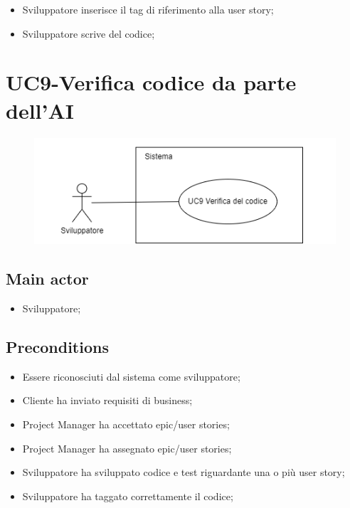 \documentclass{article}
\begin{document}
        \begin{itemize}
            \item Sviluppatore inserisce il tag di riferimento alla user story;
            \item Sviluppatore scrive del codice;
        \end{itemize}

\section{UC9-Verifica codice da parte dell'AI}
    \begin{figure}[h]
      \centering
      \includegraphics{./imgUML/UC9.png}
      \label{fig:immagine}
    \end{figure}
    
    \subsection*{Main actor}
        \begin{itemize}
            \item Sviluppatore;
        \end{itemize}
        
    \subsection*{Preconditions}
        \begin{itemize}
            \item Essere riconosciuti dal sistema come sviluppatore;
            \item Cliente ha inviato requisiti di business;
            \item Project Manager ha accettato epic/user stories;
            \item Project Manager ha assegnato epic/user stories;
            \item Sviluppatore ha sviluppato codice e test riguardante una o più user story;
            \item Sviluppatore ha taggato correttamente il codice;
        \end{itemize}
        
\end{document}
